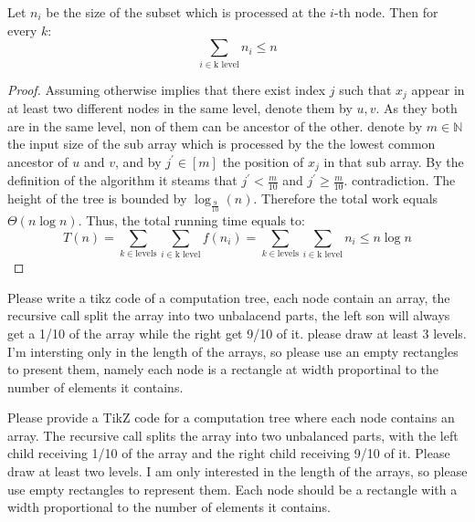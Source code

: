 \begin{example}
\begin{claim}
Let \(n_i\) be the size of the subset which is processed at the \(i\)-th node. Then for every \(k\):
\begin{equation*}
    \sum_{i \in \text{k level}}{n_i} \le n
\end{equation*}
\end{claim}
\begin{proof} Assuming otherwise implies that there exist index \(j\) such that \(x_j\) appear in at least two different nodes in the same level, denote them by \(u,v\). As they both are in the same level, non of them can be ancestor of the other. denote by \(m \in \mathbb{N}\) the input size of the sub array which is processed by the the lowest common ancestor of \(u\) and \(v\), and by \(j^\prime \in [m]\) the position of \(x_j\) in that sub array. By the definition of the algorithm it steams that \(j^\prime < \frac{m}{10} \) and \(j^\prime \ge \frac{m}{10}\). contradiction.  The height of the tree is bounded by \( \log_{\frac{9}{10}} \left(n\right) \). Therefore the total work equals \( \Theta \left( n\log n \right) \). Thus, the total running time equals to:
\begin{equation*}
    T(n) = \sum_{k \in \text{levels}}{\sum_{i \in \text{k level}}{f\left(n_i\right)}} = \sum_{k \in \text{levels}}{\sum_{i \in \text{k level}}{n_i}} \le n\log n  
\end{equation*}
\end{proof}
\end{example}



Please write a tikz code of a computation tree, each node contain an array, the recursive call split the array into two unbalacend parts, the left son will always get a 1/10 of the array while the right get 9/10 of it. please draw at least 3 levels. I'm intersting only in the length of the arrays, so please use an empty rectangles to present them, namely each node is a rectangle at width proportinal to the number of elements it contains.   

Please provide a TikZ code for a computation tree where each node contains an array. The recursive call splits the array into two unbalanced parts, with the left child receiving 1/10 of the array and the right child receiving 9/10 of it. Please draw at least two levels. I am only interested in the length of the arrays, so please use empty rectangles to represent them. Each node should be a rectangle with a width proportional to the number of elements it contains.  
	
